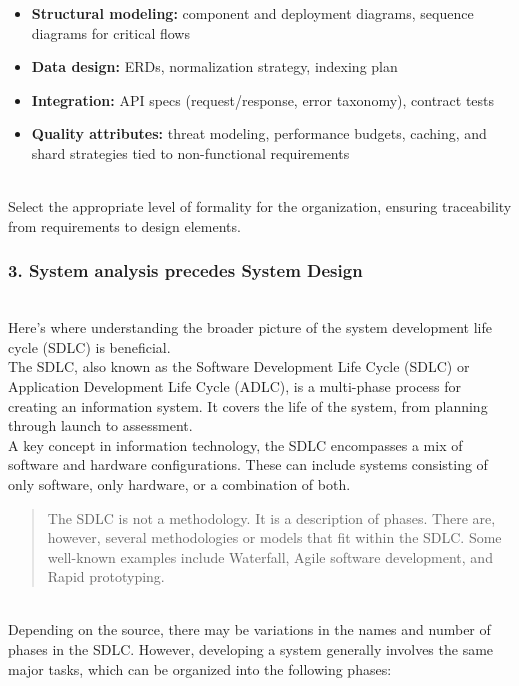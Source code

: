 \begin{itemize}
\item
\textbf{Structural modeling:} component and deployment diagrams, sequence diagrams for critical flows
\item
\textbf{Data design:} ERDs, normalization strategy, indexing plan
\item
\textbf{Integration:} API specs (request/response, error taxonomy), contract tests
\item
\textbf{Quality attributes:} threat modeling, performance budgets, caching, and shard strategies tied to non-functional requirements
\end{itemize}
\\
Select the appropriate level of formality for the organization, ensuring traceability from requirements to design elements.

\subsubsection{3. System analysis precedes System Design}\label{system-analysis-precedes-system-design}
\\
Here's where understanding the broader picture of the system development life cycle (SDLC) is beneficial.
\\
The SDLC, also known as the Software Development Life Cycle (SDLC) or Application Development Life Cycle (ADLC), is a multi-phase process for creating an information system. It covers the life of the system, from planning through launch to assessment.
\\
A key concept in information technology, the SDLC encompasses a mix of software and hardware configurations. These can include systems consisting of only software, only hardware, or a combination of both.
\begin{quote}
The SDLC is not a methodology. It is a description of phases. There are, however, several methodologies or models that fit within the SDLC. Some well-known examples include Waterfall, Agile software development, and Rapid prototyping.
\end{quote}
\\
Depending on the source, there may be variations in the names and number of phases in the SDLC. However, developing a system generally involves the same major tasks, which can be organized into the following phases:

